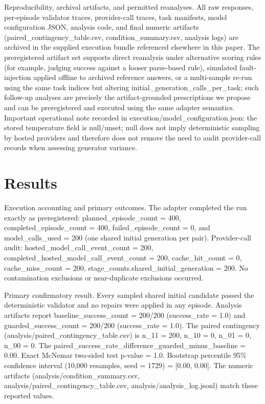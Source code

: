 \documentclass[conference]{IEEEtran}
\begin{document}
Reproducibility, archival artifacts, and permitted reanalyses. All raw responses, per-episode validator traces, provider-call traces, task manifests, model configuration JSON, analysis code, and final numeric artifacts (paired\_contingency\_table.csv, condition\_summary.csv, analysis logs) are archived in the supplied execution bundle referenced elsewhere in this paper. The preregistered artifact set supports direct reanalysis under alternative scoring rules (for example, judging success against a looser parse-based rule), simulated fault-injection applied offline to archived reference answers, or a multi-sample re-run using the same task indices but altering initial\_generation\_calls\_per\_task; such follow-up analyses are precisely the artifact-grounded prescriptions we propose and can be preregistered and executed using the same adapter semantics. Important operational note recorded in execution/model\_configuration.json: the stored temperature field is null/unset; null does not imply deterministic sampling by hosted providers and therefore does not remove the need to audit provider-call records when assessing generator variance.

\section{Results}
Execution accounting and primary outcomes. The adapter completed the run exactly as preregistered: planned\_episode\_count = 400, completed\_episode\_count = 400, failed\_episode\_count = 0, and model\_calls\_used = 200 (one shared initial generation per pair). Provider-call audit: hosted\_model\_call\_event\_count = 200, completed\_hosted\_model\_call\_event\_count = 200, cache\_hit\_count = 0, cache\_miss\_count = 200, stage\_counts.shared\_initial\_generation = 200. No contamination exclusions or near-duplicate exclusions occurred.

Primary confirmatory result. Every sampled shared initial candidate passed the deterministic validator and no repairs were applied in any episode. Analysis artifacts report baseline\_success\_count = 200/200 (success\_rate = 1.0) and guarded\_success\_count = 200/200 (success\_rate = 1.0). The paired contingency (analysis/paired\_contingency\_table.csv) is n\_11 = 200, n\_10 = 0, n\_01 = 0, n\_00 = 0. The paired\_success\_rate\_difference\_guarded\_minus\_baseline = 0.00. Exact McNemar two-sided test p-value = 1.0. Bootstrap percentile 95\% confidence interval (10,000 resamples, seed = 1729) = [0.00, 0.00]. The numeric artifacts (analysis/condition\_summary.csv, analysis/paired\_contingency\_table.csv, analysis/analysis\_log.jsonl) match these reported values.
\end{document}
